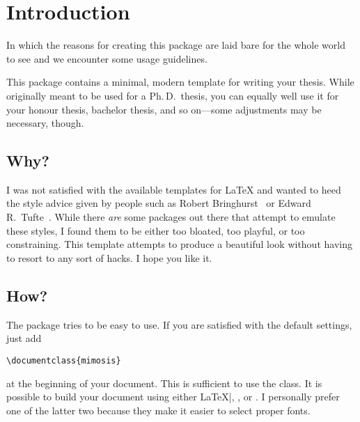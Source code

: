 \chapter{Introduction}

\begin{center}
  \begin{minipage}{0.5\textwidth}
    \begin{small}
      In which the reasons for creating this package are laid bare for the
      whole world to see and we encounter some usage guidelines.
    \end{small}
  \end{minipage}
  \vspace{0.5cm}
\end{center}

\noindent This package contains a minimal, modern template for writing your
thesis. While originally meant to be used for a Ph.\,D.\ thesis, you can
equally well use it for your honour thesis, bachelor thesis, and so
on---some adjustments may be necessary, though.

\section{Why?}

I was not satisfied with the available templates for \LaTeX{} and wanted
to heed the style advice given by people such as Robert
Bringhurst~\cite{Bringhurst12} or Edward R.\
Tufte~\cite{Tufte90,Tufte01}. While there \emph{are} some packages out
there that attempt to emulate these styles, I found them to be either
too bloated, too playful, or too constraining. This template attempts to
produce a beautiful look without having to resort to any sort of hacks.
I hope you like it.

\section{How?}

The package tries to be easy to use. If you are satisfied with the
default settings, just add
%
\begin{verbatim}
\documentclass{mimosis}
\end{verbatim}
%
at the beginning of your document. This is sufficient to use the class.
It is possible to build your document using either \LaTeX|, \XeLaTeX, or
\LuaLaTeX. I personally prefer one of the latter two because they make
it easier to select proper fonts.

